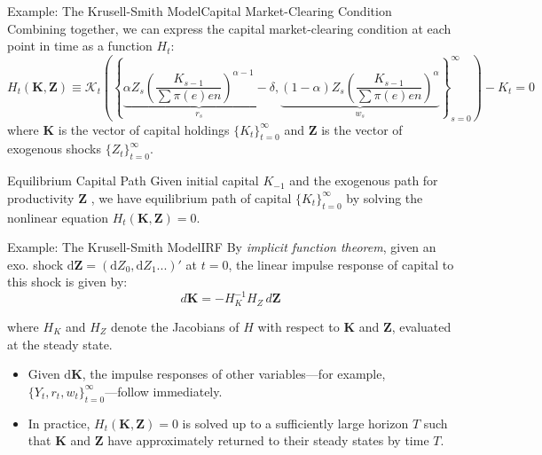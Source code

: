 \documentclass[aspectratio=169]{beamer}
\begin{document}
\begin{frame}{Example: The Krusell-Smith Model}{Capital Market-Clearing Condition}
    Combining together, we can express the capital market-clearing condition at each point in time as a function $H_t$:
    \[H_t(\bm{K},\bm{Z})\equiv\mathcal{K}_t\left(\left\{ \underbrace{\alpha Z_s\left(\frac{K_{s-1}}{\sum\pi(e)en}\right)^{\alpha-1}-\delta}_{r_s}, \underbrace{(1-\alpha)Z_s\left(\frac{K_{s-1}}{\sum\pi(e)en}\right)^\alpha}_{w_s} \right\}_{s=0}^{\infty}\right)-K_t=0\]
    where $\bm{K}$ is the vector of capital holdings $\{K_t\}_{t=0}^{\infty}$ and $\bm{Z}$ is the vector of exogenous shocks $\{Z_t\}_{t=0}^{\infty}$.

    \begin{block}{Equilibrium Capital Path}
        Given initial capital $K_{-1}$ and the exogenous path for productivity $\bm{Z}$ , we have equilibrium path of capital $\{K_t\}_{t=0}^{\infty}$ by \alert{solving the nonlinear equation $H_t(\bm{K},\bm{Z})=0$}.
    \end{block}

\end{frame}


\begin{frame}{Example: The Krusell-Smith Model}{IRF}
    By  \emph{implicit function theorem}, given an exo. shock $\mathrm{d} \bm{Z}= (\mathrm{d} Z_0,\mathrm{d} Z_1...)'$ at $t=0$, the linear impulse response of capital to this shock is given by:
    \[
        d\bm{K} = - H_K^{-1} H_Z \, d\bm{Z}
    \]

    where $H_K$ and $H_Z$ denote the Jacobians of $H$ with respect to $\bm{K}$ and $\bm{Z}$, evaluated at the steady state.
    \begin{itemize}
        \item Given $\mathrm{d}\bm{K}$, the impulse responses of other variables—for example, $\{Y_t, r_t, w_t\}_{t=0}^{\infty}$—follow immediately.

        \item In practice, $H_t(\bm{K},\bm{Z})=0$ is solved up to a sufficiently large horizon $T$ such that $\bm{K}$ and $\bm{Z}$ have approximately returned to their steady states by time $T$.
    \end{itemize}
\end{frame}
\end{document}
